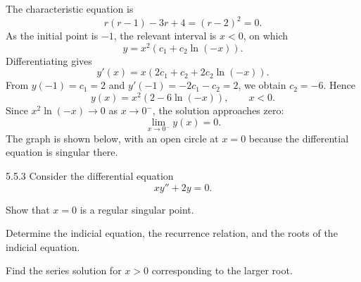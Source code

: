 \documentclass[11pt,oneside]{article}
\begin{document}
\begin{solution}
The characteristic equation is
\[
    r(r-1)-3r+4=(r-2)^2=0.
\]
As the initial point is $-1$, the relevant interval is $x<0$, on which
\[
    y=x^2(c_1+c_2\ln(-x)).
\]
Differentiating gives
\[
    y'(x)=x(2c_1+c_2+2c_2\ln(-x)).
\]
From $y(-1)=c_1=2$ and $y'(-1)=-2c_1-c_2=2$, we obtain $c_2=-6$. Hence
\[
    \boxed{y(x)=x^2(2-6\ln(-x))}, \qquad x<0.
\]
Since $x^2\ln(-x)\to0$ as $x\to0^-$, the solution approaches zero:
\[
    \boxed{\lim_{x\to0^-}y(x)=0}.
\]
The graph is shown below, with an open circle at $x=0$ because the differential equation is singular there.
\begin{center}
\end{center}
\end{solution}



\begin{problem}{5.5.3}
Consider the differential equation
\[
    xy''+2y=0.
\]
\begin{problemsubparts}
    \item Show that $x=0$ is a regular singular point.
    \item Determine the indicial equation, the recurrence relation, and the roots of the indicial equation.
    \item Find the series solution for $x>0$ corresponding to the larger root.
\end{problemsubparts}
\end{problem}
\end{document}
